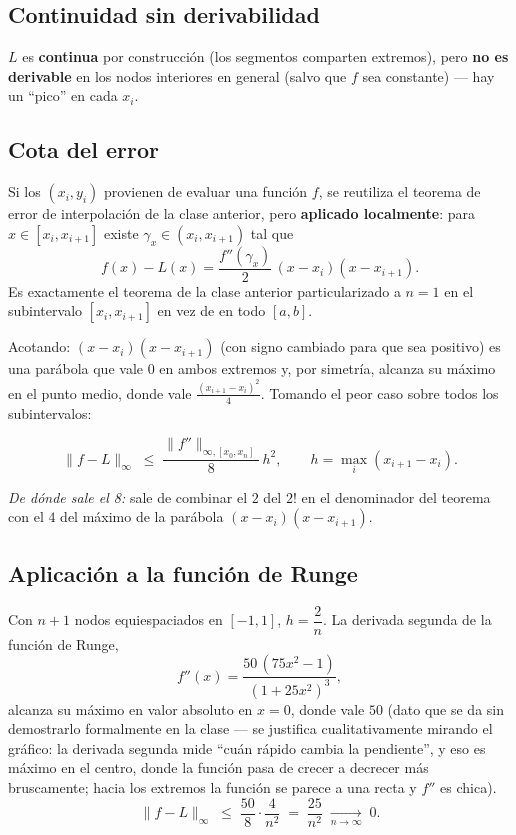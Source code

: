 \documentclass[12pt,a4paper]{article}
\begin{document}
\subsection{Continuidad sin derivabilidad}

$L$ es \textbf{continua} por construcción (los segmentos comparten
extremos), pero \textbf{no es derivable} en los nodos interiores en general
(salvo que $f$ sea constante) --- hay un ``pico'' en cada $x_i$.

\subsection{Cota del error}

Si los $(x_i,y_i)$ provienen de evaluar una función $f$, se reutiliza el
teorema de error de interpolación de la clase anterior, pero
\textbf{aplicado localmente}: para $x \in [x_i,x_{i+1}]$ existe $\gamma_x
\in (x_i,x_{i+1})$ tal que
\[
f(x) - L(x) = \frac{f''(\gamma_x)}{2}\,(x-x_i)(x-x_{i+1}).
\]
Es exactamente el teorema de la clase anterior particularizado a $n=1$ en el
subintervalo $[x_i,x_{i+1}]$ en vez de en todo $[a,b]$.

Acotando: $(x-x_i)(x-x_{i+1})$ (con signo cambiado para que sea positivo) es
una parábola que vale $0$ en ambos extremos y, por simetría, alcanza su
máximo en el punto medio, donde vale $\frac{(x_{i+1}-x_i)^2}{4}$. Tomando el
peor caso sobre todos los subintervalos:
\begin{keybox}
\[
\|f - L\|_\infty \;\le\; \frac{\|f''\|_{\infty,[x_0,x_n]}}{8}\,h^2,
\qquad h = \max_i (x_{i+1}-x_i).
\]
\end{keybox}

\noindent\textit{De dónde sale el 8:} sale de combinar el $2$ del $2!$ en el
denominador del teorema con el $4$ del máximo de la parábola
$(x-x_i)(x-x_{i+1})$.

\subsection{Aplicación a la función de Runge}

Con $n+1$ nodos equiespaciados en $[-1,1]$, $h = \dfrac{2}{n}$. La derivada
segunda de la función de Runge,
\[
f''(x) = \frac{50\,(75x^2-1)}{(1+25x^2)^3},
\]
alcanza su máximo en valor absoluto en $x=0$, donde vale $50$ (dato que se
da sin demostrarlo formalmente en la clase --- se justifica
cualitativamente mirando el gráfico: la derivada segunda mide ``cuán rápido
cambia la pendiente'', y eso es máximo en el centro, donde la función pasa
de crecer a decrecer más bruscamente; hacia los extremos la función se
parece a una recta y $f''$ es chica).
\[
\|f - L\|_\infty \;\le\; \frac{50}{8}\cdot\frac{4}{n^2} \;=\; \frac{25}{n^2}
\;\xrightarrow[n\to\infty]{}\; 0.
\]
\end{document}
